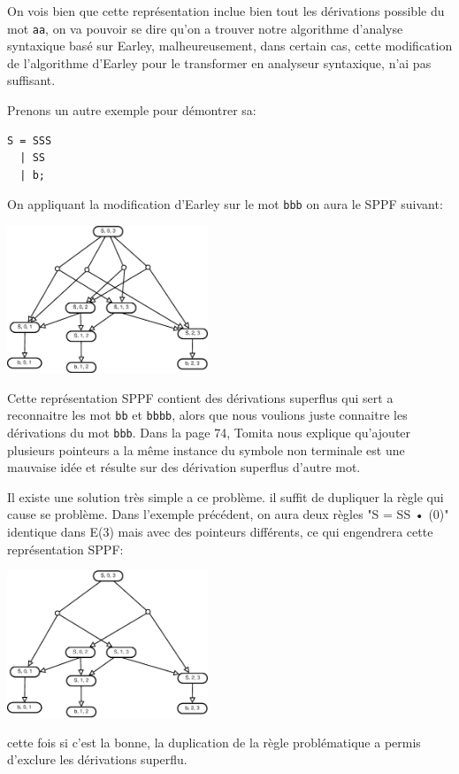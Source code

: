 \documentclass[10pt]{report}
\begin{document}
On vois bien que cette représentation inclue bien tout les dérivations possible du mot \lstinline|aa|, on va pouvoir se dire qu'on a trouver notre algorithme d'analyse syntaxique basé sur Earley, malheureusement, dans certain cas, cette modification de l'algorithme d'Earley pour le transformer en analyseur syntaxique, n'ai pas suffisant. 

Prenons un autre exemple pour démontrer sa:
\begin{lstlisting}
S = SSS 
  | SS
  | b;
\end{lstlisting}

On appliquant la modification d'Earley sur le mot \lstinline|bbb| on aura le SPPF suivant:

\includegraphics[width=6cm]{Diagramme4.eps}

Cette représentation SPPF contient des dérivations superflus qui sert a reconnaitre les mot \lstinline|bb| et \lstinline|bbbb|, alors que nous voulions juste connaitre les dérivations du mot \lstinline|bbb|. Dans la page 74\cite{Tomita}, Tomita nous explique qu'ajouter plusieurs pointeurs a la même instance du symbole non terminale est une mauvaise idée et résulte sur des dérivation superflus d'autre mot.

Il existe une solution très simple a ce problème. il suffit de dupliquer la règle qui cause se problème. Dans l'exemple précédent, on aura deux règles "S = SS • (0)" identique dans E(3) mais avec des pointeurs différents, ce qui engendrera cette représentation SPPF:

\includegraphics[width=6cm]{Diagramme5.eps}

cette fois si c'est la bonne, la duplication de la règle problématique a permis d'exclure les dérivations superflu.
\end{document}
